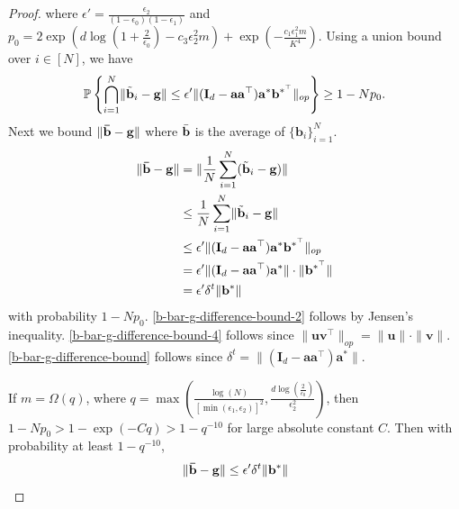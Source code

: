 \documentclass{article}
\theoremstyle{plain}
\theoremstyle{definition}
\theoremstyle{remark}
\begin{document}
\begin{proof}
where $\epsilon' = \frac{\epsilon_2}{(1-\epsilon_0)(1-\epsilon_{1})}$ and $p_0 = 2\exp{(d\log(1+{\textstyle\frac{2}{\epsilon_0}})-c_3 \epsilon_2^2 m )} + \exp{(- \frac{c_1 \epsilon_1^2 m}{K^4})} $. Using a union bound over $i \in [N]$, we have
\begin{align}
  \mathbb{P} \left\{\bigcap_{i=1}^N \lVert \Tilde{\mathbf{b}}_i- \mathbf{g} \rVert \leq \epsilon' \|(\mathbf{I}_d - \mathbf{a}\mathbf{a}^\top) \mathbf{a}^* \mathbf{b}^{*^\top}\|_{op} \right\} \geq 1 - Np_0.  
\end{align}
Next we bound $\lVert \mathbf{\Bar{b}}-\mathbf{g}\rVert$ where $ \Bar{\mathbf{b}}$ is the average of $\{\mathbf{b}_i\}_{i=1}^N$.
\begin{align}
\lVert \mathbf{\Bar{b}}-\mathbf{g}\rVert & = \lVert \frac{1}{N}\sum_{i=1}^{N}(\Tilde{\mathbf{b}}_i-\mathbf{g})\rVert    \\
&\leq \frac{1}{N}\sum_{i=1}^{N}\lVert\Tilde{\mathbf{b}}_i-\mathbf{g}\rVert \label{b-bar-g-difference-bound-2}\\
&\leq \epsilon' \|(\mathbf{I}_d - \mathbf{a}\mathbf{a}^\top ) \mathbf{a}^*\mathbf{b}^{*^\top}\|_{op} \\
&= \epsilon' \|(\mathbf{I}_d - \mathbf{a}\mathbf{a}^\top ) \mathbf{a}^*\| \cdot \|\mathbf{b}^{*^\top}\|\label{b-bar-g-difference-bound-4} \\
& = \epsilon' \delta^t \lVert \mathbf{b}^*\rVert \label{b-bar-g-difference-bound}
\end{align}
with probability $1-Np_0$. \eqref{b-bar-g-difference-bound-2} follows by Jensen's inequality. \eqref{b-bar-g-difference-bound-4} follows since $\|\mathbf{u}\mathbf{v}^\top\|_{op} = \| \mathbf{u}\| \cdot  \|\mathbf{v} \|$. \eqref{b-bar-g-difference-bound} follows since $\delta^t = \lVert (\mathbf{I}_d-\mathbf{a}\mathbf{a}^{\top})\mathbf{a}^*\rVert$. 

If $m=\Omega(q)$, where $q=\max(\frac{\log(N)}{[\min(\epsilon_1,\epsilon_2)]^2},\frac{d\log(\frac{2}{\epsilon_0})}{\epsilon_2^2})$, then $1-Np_0 >1-\exp(-Cq)> 1-q^{-10}$ for large absolute constant $C$. Then with probability at least $1-q^{-10}$, 
\begin{align}
    \lVert \mathbf{\Bar{b}}-\mathbf{g}\rVert \leq \epsilon' \delta^t \| \mathbf{b}^* \|
\end{align}
\end{proof}
\end{document}
